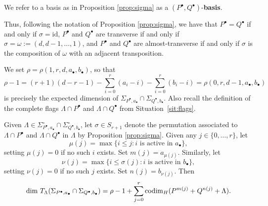 \documentclass{amsart}
\begin{document}
\begin{defn} We refer to a basis as in Proposition \ref{prop:sigma} as
a $(P^{\bullet},Q^{\bullet})$-\textbf{basis}. 
\end{defn}

Thus, following the notation of Proposition \ref{prop:sigma}, we have
that $P^{\bullet}=Q^{\bullet}$ if and only if $\sigma=\mathrm{id}$, 
$P^{\bullet}$ and $Q^{\bullet}$ are transverse if and only if 
$\sigma = \omega := (d,d-1,\ldots,1)$, and $P^{\bullet}$ and $Q^{\bullet}$ 
are almost-transverse if and only if $\sigma$ is the composition of $\omega$ 
with an adjacent transposition.

We set $\rho = \rho(1,r,d,a_{\bullet},b_{\bullet})$, so that 
$$\rho-1=(r+1)(d-r-1)-\sum_{i=0}^r (a_i-i)-\sum_{i=0}^r (b_i-i)
= \rho(0,r,d-1,a_{\bullet},b_{\bullet})$$
is precisely the expected dimension of 
$\Sigma_{P^{\bullet},a_{\bullet}} \cap \Sigma_{Q^{\bullet},b_{\bullet}}$.
Also recall the definition of the complete flags $\Lambda\cap P^\bullet$ and $\Lambda\cap Q^\bullet$ from Situation~\ref{sit:flags}.

\begin{thm}\label{thm:workhorse}
Given $\Lambda 
\in {\Sigma}^\circ_{P^{\bullet},a_{\bullet}} \cap {\Sigma}^\circ_{Q^{\bullet},b_{\bullet}}$,
let $\sigma \in S_{r+1}$ denote the permutation associated to
$\Lambda\cap P^{\bullet}$ and $\Lambda\cap Q^{\bullet}$ in $\Lambda$
by Proposition \ref{prop:sigma}. 
Given any $j\in \{0,\ldots,r\}$, let 
$$\mu(j) = \max\{i\le j: i\text{ is active in $a_{\bullet}$}\},$$
setting $\mu(j) = 0$ if no such $i$ exists.  Set $m(j) = a_{\mu(j)}.$
Similarly, let 
$$\nu(j) = \max\{i\le \sigma(j): i\text{ is active in $b_{\bullet}$}\},$$ 
setting $\nu(j) = 0$ if no such $j$ exists. Set $n(j) = b_{\nu(j)}$.
Then
\begin{equation}\label{eq:the-answer}
\dim \, 
T_\Lambda (\Sigma_{P^{\bullet},a_{\bullet}} \cap \Sigma_{Q^{\bullet},b_{\bullet}})
= \rho-1 + \sum_{j=0}^r \operatorname{codim}_H (P^{m(j)} + Q^{n(j)} + \Lambda).
\end{equation}
\end{thm}
\end{document}
